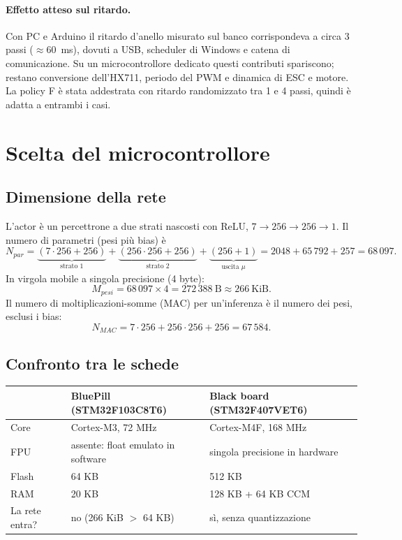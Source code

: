 \documentclass[11pt,a4paper]{article}
\begin{document}
\paragraph{Effetto atteso sul ritardo.} Con PC e Arduino il ritardo d'anello misurato sul banco
corrispondeva a circa 3 passi ($\approx 60$~ms), dovuti a USB, scheduler di Windows e catena di
comunicazione. Su un microcontrollore dedicato questi contributi spariscono; restano conversione
dell'HX711, periodo del PWM e dinamica di ESC e motore. La policy F è stata addestrata con ritardo
randomizzato tra 1 e 4 passi, quindi è adatta a entrambi i casi.

\section{Scelta del microcontrollore}

\subsection{Dimensione della rete}
L'actor è un percettrone a due strati nascosti con ReLU, $7 \to 256 \to 256 \to 1$.
Il numero di parametri (pesi più bias) è
\begin{equation}
N_{par} = \underbrace{(7\cdot 256 + 256)}_{\text{strato 1}} + \underbrace{(256\cdot 256 + 256)}_{\text{strato 2}}
        + \underbrace{(256 + 1)}_{\text{uscita } \mu} = 2048 + 65\,792 + 257 = 68\,097 .
\end{equation}
In virgola mobile a singola precisione (4 byte):
\begin{equation}
M_{pesi} = 68\,097 \times 4 = 272\,388\ \text{B} \approx 266\ \text{KiB}.
\end{equation}
Il numero di moltiplicazioni-somme (MAC) per un'inferenza è il numero dei pesi, esclusi i bias:
\begin{equation}
N_{MAC} = 7\cdot256 + 256\cdot256 + 256 = 67\,584 .
\end{equation}

\subsection{Confronto tra le schede}
\begin{center}
\begin{tabularx}{\textwidth}{@{}lXX@{}}
\toprule
 & \textbf{BluePill (STM32F103C8T6)} & \textbf{Black board (STM32F407VET6)}\\
\midrule
Core          & Cortex-M3, 72 MHz             & Cortex-M4F, 168 MHz\\
FPU           & assente: float emulato in software & singola precisione in hardware\\
Flash         & 64 KB                         & 512 KB\\
RAM           & 20 KB                         & 128 KB + 64 KB CCM\\
La rete entra? & no (266 KiB $>$ 64 KB)       & sì, senza quantizzazione\\
\bottomrule
\end{tabularx}
\end{center}
\end{document}
